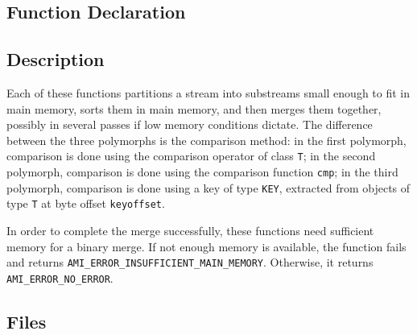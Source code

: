 \subsection{Function Declaration}
  \btabb
     {}
     {}
     {}
  \etabb

\subsection{Description}
Each of these functions partitions a stream into substreams small
enough to fit in main memory, sorts them in main memory, and then
merges them together, possibly in several passes if low memory conditions
dictate. The difference between the three polymorphs is the comparison
method: in the first polymorph, comparison is done using the comparison
operator of class \lstinline|T|; in the second polymorph, comparison is done
using the comparison function \lstinline|cmp|; in the third polymorph,
comparison is done using a key of type \lstinline|KEY|, extracted from objects
of type \lstinline|T| at byte offset \lstinline|keyoffset|.

In order to complete the merge successfully, these functions need sufficient
memory for a binary merge. If not enough memory is available, the function
fails and returns
\lstinline|AMI_ERROR_INSUFFICIENT_MAIN_MEMORY|. Otherwise, it returns
\lstinline|AMI_ERROR_NO_ERROR|.


\subsection{Files}
  \btabb
     {}
  \etabb

